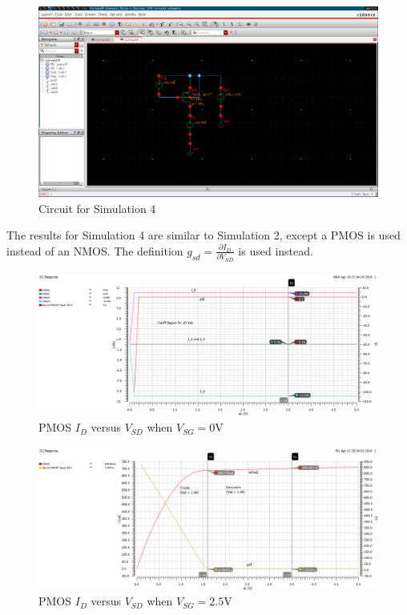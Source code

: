 \FloatBarrier

\begin{figure}[h!]
	\centering
	\includegraphics[scale=0.30]{../images/circuit4.PNG}
	\caption{Circuit for Simulation 4}
	\label{fig:circuit4}
\end{figure}

\FloatBarrier
The results for Simulation 4 are similar to Simulation 2, except a PMOS is used instead of an NMOS.
The definition $g_{sd} = \frac{\partial I_{D}}{\partial V_{SD}}$ is used instead.

\FloatBarrier

\begin{figure}[h!]
	\centering
	\includegraphics[scale=0.30]{../images/id_vs_vds_vgs_is_0_pmos.PNG}
	\caption{PMOS $I_{D}$ versus $V_{SD}$ when $V_{SG} = 0$\si{\volt}}
	\label{fig:id_vs_vds_vgs_is_0_pmos}
\end{figure}

\FloatBarrier

\FloatBarrier

\begin{figure}[h!]
	\centering
	\includegraphics[scale=0.30]{../images/id_vs_vds_vgs_is_2_5_pmos.PNG}
	\caption{PMOS $I_{D}$ versus $V_{SD}$ when $V_{SG} = 2.5$\si{\volt}}
	\label{fig:id_vs_vds_vgs_is_2_5_pmos}
\end{figure}

